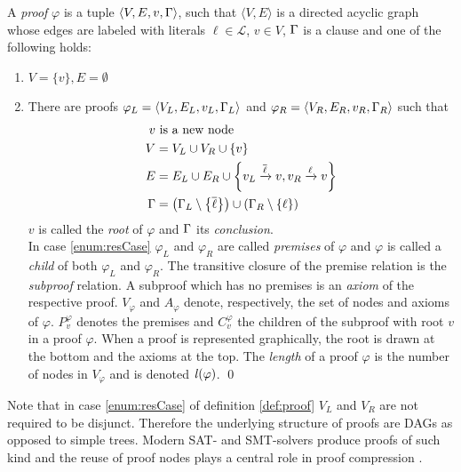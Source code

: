 \documentclass{llncs}
\newcommand{\Vertices}[1]{V_{#1}}
\newcommand{\Premises}[2]{P_{#1}^{#2}}
\newcommand{\Children}[2]{C_{#1}^{#2}}
\newcommand{\Axioms}[1]{A_{#1}}
\begin{document}
\newcommand{\axiom}[1]{\widehat{#1}}
\newcommand{\n}{v}
\newcommand{\raiz}[1]{\rho(#1)}

\begin{definition}[Proof] 
\label{def:proof}
A \emph{proof} $\varphi$ is a tuple $\langle V,E,\n,\clause \rangle$, 
such that $\langle V,E \rangle$ is a directed acyclic graph whose edges are labeled with literals $\ell \in \mathcal{L}$, $\n \in V$, $\Gamma$ is a clause 
and one of the following holds:

\begin{enumerate}
	\item $V = \{\n\}, E = \emptyset$
	\item \label{enum:resCase} There are proofs $\varphi_L = \langle V_L, E_L, \n_L,\clause_L \rangle$ and $\varphi_R = \langle V_R, E_R, \n_R, \clause_R \rangle$ such that 
	    \begin{align*}
			\n & \text{ is a new node} \\
      V &= V_L \cup V_R \cup \{\n \} \\
      E &= E_L \cup E_R \cup
                    \left\{\n_L \xrightarrow{\dual{\ell}} \n , \n_R \xrightarrow{\ell} \n \right\} \\
     \Gamma &= \left( \clause_L \setminus \left\{ \dual{\ell} \right\} \right) \cup \left( \clause_R
                    \setminus \left\{ \ell \right\} \right)
    \end{align*}
		$\n$ is called the \emph{root} of $\varphi$ and $\Gamma$ its \emph{conclusion}.\\
		In case \ref{enum:resCase} $\varphi_L$ and $\varphi_R$ are called \emph{premises} of $\varphi$ and $\varphi$ is called a \emph{child} of both $\varphi_L$ and $\varphi_R$.
		The transitive closure of the premise relation is the \emph{subproof} relation. A subproof which
		has no premises is an \emph{axiom} of the respective proof.
		$\Vertices{\varphi}$ and $\Axioms{\varphi}$ denote, respectively, the set of nodes and axioms of $\varphi$. $\Premises{\n}{\varphi}$ denotes the premises and $\Children{\n}{\varphi}$ the children of the subproof with root $\n$ in a proof $\varphi$. When a proof is represented graphically, the root is drawn at the bottom and the axioms at the top. The \emph{length} of a proof $\varphi$ is the number of nodes in $\Vertices{\varphi}$ and is denoted $\mathit{l}(\varphi)$.
  \qed
\end{enumerate}

\end{definition}

\noindent
Note that in case \ref{enum:resCase} of definition \ref{def:proof} $V_L$ and $V_R$ are not required to be disjunct. Therefore the underlying structure of proofs are DAGs as opposed to simple trees. Modern SAT- and SMT-solvers produce proofs of such kind \cite{BoutonCaminha-B.-de-OliveiraDeharbeFontaine2009veriT:-an-open-trustable-and-efficient-SMT-Solver,marques2009conflict} and the reuse of proof nodes plays a central role in proof compression \cite{fontaine2011compression}.
\end{document}
